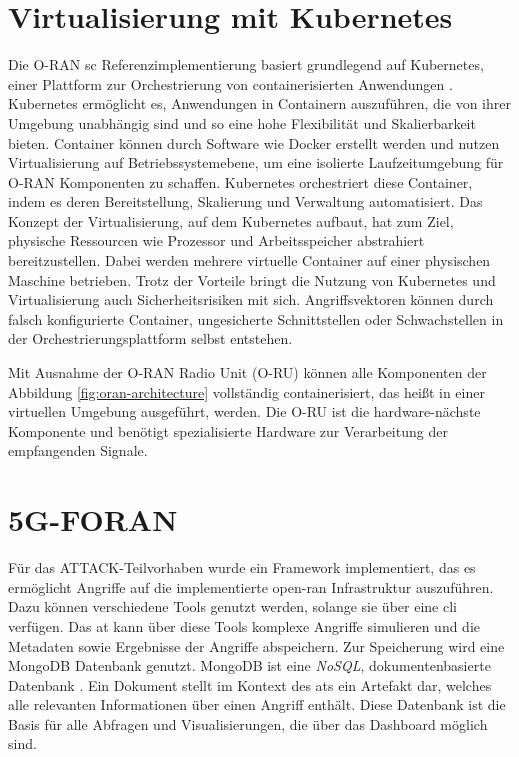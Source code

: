 \section{Virtualisierung mit Kubernetes}
Die O-RAN \gls{sc} Referenzimplementierung basiert grundlegend auf Kubernetes, einer Plattform zur Orchestrierung von containerisierten Anwendungen \autocite{ReleaseReleasesConfluence}. Kubernetes ermöglicht es, Anwendungen in Containern auszuführen, die von ihrer Umgebung unabhängig sind und so eine hohe Flexibilität und Skalierbarkeit bieten. Container können durch Software wie Docker erstellt werden und nutzen Virtualisierung auf Betriebssystemebene, um eine isolierte Laufzeitumgebung für O-RAN Komponenten zu schaffen. Kubernetes orchestriert diese Container, indem es deren Bereitstellung, Skalierung und Verwaltung automatisiert. Das Konzept der Virtualisierung, auf dem Kubernetes aufbaut, hat zum Ziel, physische Ressourcen wie Prozessor und Arbeitsspeicher abstrahiert bereitzustellen. Dabei werden mehrere virtuelle Container auf einer physischen Maschine betrieben. Trotz der Vorteile bringt die Nutzung von Kubernetes und Virtualisierung auch Sicherheitsrisiken mit sich. Angriffsvektoren können durch falsch konfigurierte Container, ungesicherte Schnittstellen oder Schwachstellen in der Orchestrierungsplattform selbst entstehen.
\par Mit Ausnahme der O-RAN Radio Unit (O-RU) können alle Komponenten der Abbildung \ref{fig:oran-architecture} vollständig containerisiert, das heißt in einer virtuellen Umgebung ausgeführt, werden. Die O-RU ist die hardware-nächste Komponente und benötigt spezialisierte Hardware zur Verarbeitung der empfangenden Signale.

\section{5G-FORAN}
\label{sec:tech-foran}
Für das ATTACK-Teilvorhaben wurde ein Framework implementiert, das es ermöglicht Angriffe auf die implementierte \gls{open-ran} Infrastruktur auszuführen. Dazu können verschiedene Tools genutzt werden, solange sie über eine \gls{cli} verfügen. Das \gls{at} kann über diese Tools komplexe Angriffe simulieren und die Metadaten sowie Ergebnisse der Angriffe abspeichern. Zur Speicherung wird eine MongoDB Datenbank genutzt. MongoDB ist eine \textit{NoSQL}, dokumentenbasierte Datenbank \autocite{MongoDBDeveloperData}. Ein Dokument stellt im Kontext des \glspl{at} ein Artefakt dar, welches alle relevanten Informationen über einen Angriff enthält. Diese Datenbank ist die Basis für alle Abfragen und Visualisierungen, die über das Dashboard möglich sind.

